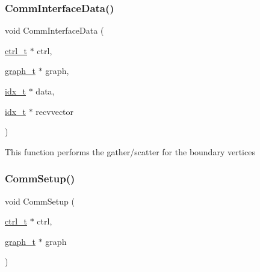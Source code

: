 \mbox{\label{a00951_a4ea1863ed9e161bc82ff3c6f0ff431c9}} 
\subsubsection{\texorpdfstring{Comm\+Interface\+Data()}{CommInterfaceData()}}
{\footnotesize\ttfamily void Comm\+Interface\+Data (\begin{DoxyParamCaption}\item[{\hyperlink{a00742}{ctrl\+\_\+t} $\ast$}]{ctrl,  }\item[{\hyperlink{a00734}{graph\+\_\+t} $\ast$}]{graph,  }\item[{\hyperlink{a00876_aaa5262be3e700770163401acb0150f52}{idx\+\_\+t} $\ast$}]{data,  }\item[{\hyperlink{a00876_aaa5262be3e700770163401acb0150f52}{idx\+\_\+t} $\ast$}]{recvvector }\end{DoxyParamCaption})}

This function performs the gather/scatter for the boundary vertices \mbox{\label{a00951_a2d2b821917225cdad1e5422fae14556e}} 
\subsubsection{\texorpdfstring{Comm\+Setup()}{CommSetup()}}
{\footnotesize\ttfamily void Comm\+Setup (\begin{DoxyParamCaption}\item[{\hyperlink{a00742}{ctrl\+\_\+t} $\ast$}]{ctrl,  }\item[{\hyperlink{a00734}{graph\+\_\+t} $\ast$}]{graph }\end{DoxyParamCaption})}

